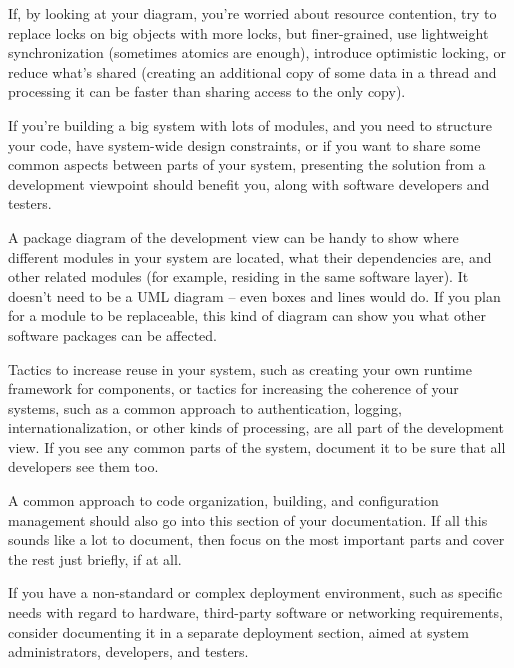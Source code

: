 If, by looking at your diagram, you're worried about resource contention, try to replace locks on big objects with more locks, but finer-grained, use lightweight synchronization (sometimes atomics are enough), introduce optimistic locking, or reduce what's shared (creating an additional copy of some data in a thread and processing it can be faster than sharing access to the only copy).





If you're building a big system with lots of modules, and you need to structure your code, have system-wide design constraints, or if you want to share some common aspects  between parts of your system, presenting the solution from a development viewpoint should benefit you, along with software developers and testers.

A package diagram of the development view can be handy to show where different modules in your system are located, what their dependencies are, and other related modules (for example, residing in the same software layer). It doesn't need to be a UML diagram – even boxes and lines would do. If you plan for a module to be replaceable, this kind of diagram can show you what other software packages can be affected.

Tactics to increase reuse in your system, such as creating your own runtime framework for components, or tactics for increasing the coherence of your systems, such as a common approach to authentication, logging, internationalization, or other kinds of processing, are all part of the development view. If you see any common parts of the system, document it to be sure that all developers see them too.

A common approach to code organization, building, and configuration management should also go into this section of your documentation. If all this sounds like a lot to document, then focus on the most important parts and cover the rest just briefly, if at all.



If you have a non-standard or complex deployment environment, such as specific needs with regard to hardware, third-party software or networking requirements, consider documenting it in a separate deployment section, aimed at system administrators, developers, and testers.

